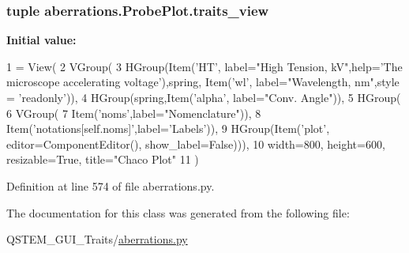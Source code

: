 \hypertarget{classaberrations_1_1_probe_plot_acbbcf0f30a788960927703ea3ca53af9}{
\subsubsection[{traits\-\_\-view}]{\setlength{\rightskip}{0pt plus 5cm}tuple aberrations.\-Probe\-Plot.\-traits\-\_\-view\hspace{0.3cm}{\ttfamily [static]}}}\label{classaberrations_1_1_probe_plot_acbbcf0f30a788960927703ea3ca53af9}
{\bfseries Initial value\-:}
\begin{DoxyCode}
1 = View(
2         VGroup(
3             HGroup(Item(\textcolor{stringliteral}{'HT'}, label=\textcolor{stringliteral}{"High Tension, kV"},help=\textcolor{stringliteral}{'The microscope accelerating voltage'}),spring,
      Item(\textcolor{stringliteral}{'wl'}, label=\textcolor{stringliteral}{"Wavelength, nm"},style = \textcolor{stringliteral}{'readonly'})),
4             HGroup(spring,Item(\textcolor{stringliteral}{'alpha'}, label=\textcolor{stringliteral}{"Conv. Angle"})),
5             HGroup(
6                 VGroup(
7                     Item(\textcolor{stringliteral}{'noms'},label=\textcolor{stringliteral}{"Nomenclature"})),
8                     Item(\textcolor{stringliteral}{'notations[self.noms]'},label=\textcolor{stringliteral}{'Labels'})),
9             HGroup(Item(\textcolor{stringliteral}{'plot'}, editor=ComponentEditor(), show\_label=\textcolor{keyword}{False}))),
10         width=800, height=600, resizable=\textcolor{keyword}{True}, title=\textcolor{stringliteral}{"Chaco Plot"}
11         )
\end{DoxyCode}


Definition at line 574 of file aberrations.\-py.



The documentation for this class was generated from the following file\-:\begin{DoxyCompactItemize}
\item 
Q\-S\-T\-E\-M\-\_\-\-G\-U\-I\-\_\-\-Traits/\hyperlink{aberrations_8py}{aberrations.\-py}\end{DoxyCompactItemize}
